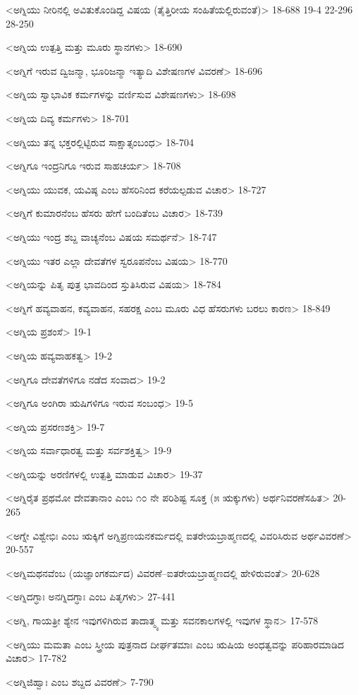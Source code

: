 <ಅಗ್ನಿಯು ನೀರಿನಲ್ಲಿ ಅವಿತುಕೊಂಡಿದ್ದ ವಿಷಯ (ತೈತ್ತಿರೀಯ ಸಂಹಿತೆಯಲ್ಲಿರುವಂತೆ)>
18-688
19-4 
22-296 
28-250

<ಅಗ್ನಿಯ ಉತ್ಪತ್ತಿ ಮತ್ತು ಮೂರು ಸ್ಥಾನಗಳು>
18-690

<ಅಗ್ನಿಗೆ ಇರುವ ದ್ವಿಜನ್ಮಾ, ಭೂರಿಜನ್ಮಾ ಇತ್ಯಾದಿ ವಿಶೇಷಣಗಳ ವಿವರಣೆ>
18-696

<ಅಗ್ನಿಯ ಸ್ವಾಭಾವಿಕ ಕರ್ಮಗಳನ್ನು ವರ್ಣಿಸುವ ವಿಶೇಷಣಗಳು>
18-698

<ಅಗ್ನಿಯ ದಿವ್ಯ ಕರ್ಮಗಳು>
18-701

<ಅಗ್ನಿಯು ತನ್ನ ಭಕ್ತರಲ್ಲಿಟ್ಟಿರುವ ಸಾಕ್ಷಾತ್ಸಂಬಂಧ>
18-704

<ಅಗ್ನಿಗೂ ಇಂದ್ರನಿಗೂ ಇರುವ ಸಾಹಚರ್ಯ>
18-708

<ಅಗ್ನಿಯು ಯುವಕ, ಯವಿಷ್ಠ ಎಂಬ ಹೆಸರಿನಿಂದ ಕರೆಯಲ್ಪಡುವ ವಿಚಾರ>
18-727

<ಅಗ್ನಿಗೆ ಕುಮಾರನೆಂಬ ಹೆಸರು ಹೇಗೆ ಬಂದಿತೆಂಬ ವಿಚಾರ>
18-739

<ಅಗ್ನಿಯು ಇಂದ್ರ ಶಬ್ದ ವಾಚ್ಯನೆಂಬ ವಿಷಯ ಸಮರ್ಥನೆ>
18-747

<ಅಗ್ನಿಯು ಇತರ ಎಲ್ಲಾ ದೇವತೆಗಳ ಸ್ವರೂಪನೆಂಬ ವಿಷಯ>
18-770

<ಅಗ್ನಿಯನ್ನು ಪಿತೃ ಪುತ್ರ ಭಾವದಿಂದ ಸ್ತುತಿಸಿರುವ ವಿಷಯ>
18-784

<ಅಗ್ನಿಗೆ ಹವ್ಯವಾಹನ, ಕವ್ಯವಾಹನ, ಸಹರಕ್ಷ ಎಂಬ ಮೂರು ವಿಧ ಹೆಸರುಗಳು ಬರಲು ಕಾರಣ>
18-849

<ಅಗ್ನಿಯ ಪ್ರಶಂಸೆ>
19-1

<ಅಗ್ನಿಯ ಹವ್ಯವಾಹಕತ್ವ>
19-2

<ಅಗ್ನಿಗೂ ದೇವತೆಗಳಿಗೂ ನಡೆದ ಸಂವಾದ>
19-2

<ಅಗ್ನಿಗೂ ಅಂಗಿರಾ ಋಷಿಗಳಿಗೂ ಇರುವ ಸಂಬಂಧ>
19-5

<ಅಗ್ನಿಯ ಪ್ರಸರಣಶಕ್ತಿ>
19-7

<ಅಗ್ನಿಯ ಸರ್ವಾಧಾರತ್ವ ಮತ್ತು ಸರ್ವಶಕ್ತಿತ್ವ>
19-9

<ಅಗ್ನಿಯನ್ನು ಅರಣಿಗಳಲ್ಲಿ ಉತ್ಪತ್ತಿ ಮಾಡುವ ವಿಚಾರ>
19-37

<ಅಗ್ನಿರೈತ ಪ್ರಥಮೋ ದೇವತಾನಾಂ ಎಂಬ ೧೦ ನೇ ಪರಿಶಿಷ್ಟ ಸೂಕ್ತ (೫ ಋಕ್ಕುಗಳು) ಅರ್ಥನಿವರಣೆಸಹಿತ>
20-265

<ಅಗ್ನೇ ವಿಶ್ವೇಭಿಃ ಎಂಬ ಋಕ್ಕಿಗೆ ಅಗ್ನಿಪ್ರಣಯನಕರ್ಮದಲ್ಲಿ ಐತರೇಯಬ್ರಾಹ್ಮಣದಲ್ಲಿ ವಿವರಿಸಿರುವ ಅರ್ಥವಿವರಣೆ>
20-557

<ಅಗ್ನಿಮಥನವೆಂಬ (ಯಜ್ಞಾಂಗಕರ್ಮದ) ವಿವರಣೆ–ಐತರೇಯಬ್ರಾಹ್ಮಣದಲ್ಲಿ ಹೇಳಿರುವಂತೆ>
20-628

<ಅಗ್ನಿದಗ್ಧಾಃ ಅನಗ್ನಿದಗ್ಧಾಃ ಎಂಬ ಪಿತೃಗಳು>
27-441

<ಅಗ್ನಿ, ಗಾಯತ್ರೀ ಶ್ಯೇನ ಇವುಗಳಿಗಿರುವ ತಾದಾತ್ಮ್ಯ ಮತ್ತು ಸವನಕಾಲಗಳಲ್ಲಿ ಇವುಗಳ ಸ್ಥಾನ>
17-578

<ಅಗ್ನಿಯು ಮಮತಾ ಎಂಬ ಸ್ತ್ರೀಯ ಪುತ್ರನಾದ ದೀರ್ಘತಮಾಃ ಎಂಬ ಋಷಿಯ ಅಂಧತ್ವವನ್ನು ಪರಿಹಾರಮಾಡಿದ ವಿಚಾರ>
17-782

<ಅಗ್ನಿಜಿಹ್ವಾಃ ಎಂಬ ಶಬ್ದದ ವಿವರಣೆ>
7-790

